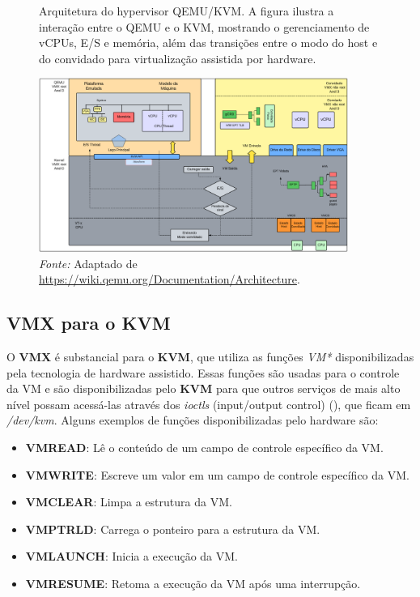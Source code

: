 \begin{figure}[htbp]
  \centering
  \caption{Arquitetura do hypervisor QEMU/KVM. A figura ilustra a interação entre o QEMU e o KVM, mostrando o gerenciamento de vCPUs, E/S e memória, além das transições entre o modo do host e do convidado para virtualização assistida por hardware.}
  \includegraphics[width=0.9\textwidth]{images/qemu_kvm_architecture.png}
  \caption*{\textit{Fonte:} Adaptado de \url{https://wiki.qemu.org/Documentation/Architecture}.}
  \label{fig:qemu_kvm_architecture}
\end{figure}


\subsection{VMX para o KVM}

O \textbf{VMX} é substancial para o \textbf{KVM}, que utiliza as funções \textit{VM*} disponibilizadas pela tecnologia de hardware assistido. Essas funções são usadas para o controle da VM e são disponibilizadas pelo \textbf{KVM} para que outros serviços de mais alto nível possam acessá-las através dos \textit{ioctls} (input/output control) (\cite{wiki:Ioctl}), que ficam em \textit{/dev/kvm}. Alguns exemplos de funções disponibilizadas pelo hardware são:

\begin{itemize}
  \item \textbf{VMREAD}: Lê o conteúdo de um campo de controle específico da VM.
  \item \textbf{VMWRITE}: Escreve um valor em um campo de controle específico da VM.
  \item \textbf{VMCLEAR}: Limpa a estrutura da VM.
  \item \textbf{VMPTRLD}: Carrega o ponteiro para a estrutura da VM.
  \item \textbf{VMLAUNCH}: Inicia a execução da VM.
  \item \textbf{VMRESUME}: Retoma a execução da VM após uma interrupção.
\end{itemize}

